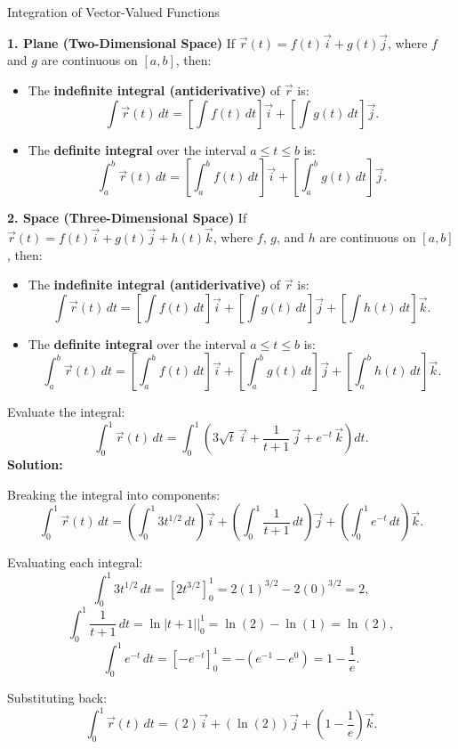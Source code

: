 \documentclass[12pt]{article}
\theoremstyle{beautifulthm}
\begin{document}
\begin{Definition}{Integration of Vector-Valued Functions}{}
    


\textbf{1. Plane (Two-Dimensional Space)}
If $\vec{r}(t) = f(t) \vec{i} + g(t) \vec{j}$, where $f$ and $g$ are continuous on $[a, b]$, then:
\begin{itemize}
    \item The \textbf{indefinite integral (antiderivative)} of $\vec{r}$ is:
    \[
    \int \vec{r}(t) \, dt = \left[ \int f(t) \, dt \right] \vec{i} + \left[ \int g(t) \, dt \right] \vec{j}.
    \]
    \item The \textbf{definite integral} over the interval $a \leq t \leq b$ is:
    \[
    \int_a^b \vec{r}(t) \, dt = \left[ \int_a^b f(t) \, dt \right] \vec{i} + \left[ \int_a^b g(t) \, dt \right] \vec{j}.
    \]
\end{itemize}

\textbf{2. Space (Three-Dimensional Space)}
If $\vec{r}(t) = f(t) \vec{i} + g(t) \vec{j} + h(t) \vec{k}$, where $f$, $g$, and $h$ are continuous on $[a, b]$, then:
\begin{itemize}
    \item The \textbf{indefinite integral (antiderivative)} of $\vec{r}$ is:
    \[
    \int \vec{r}(t) \, dt = \left[ \int f(t) \, dt \right] \vec{i} + \left[ \int g(t) \, dt \right] \vec{j} + \left[ \int h(t) \, dt \right] \vec{k}.
    \]
    \item The \textbf{definite integral} over the interval $a \leq t \leq b$ is:
    \[
    \int_a^b \vec{r}(t) \, dt = \left[ \int_a^b f(t) \, dt \right] \vec{i} + \left[ \int_a^b g(t) \, dt \right] \vec{j} + \left[ \int_a^b h(t) \, dt \right] \vec{k}.
    \]
\end{itemize}

\end{Definition}

\begin{tcolorbox}[colback=examplebg, colframe=red!75!black, title=\textbf{EXAMPLE 1: Definite Integral of a Vector-Valued Function}, fonttitle=\bfseries, sharp corners]


Evaluate the integral:
\[
\int_{0}^{1} \vec{r}(t) \, dt = \int_{0}^{1} \left( 3\sqrt{t} \, \vec{i} + \frac{1}{t+1} \, \vec{j} + e^{-t} \, \vec{k} \right) dt.
\]
\tcblower
\textbf{Solution:} 

Breaking the integral into components:
\[
\int_{0}^{1} \vec{r}(t) \, dt = \left( \int_{0}^{1} 3t^{1/2} \, dt \right) \vec{i} + \left( \int_{0}^{1} \frac{1}{t+1} \, dt \right) \vec{j} + \left( \int_{0}^{1} e^{-t} \, dt \right) \vec{k}.
\]

Evaluating each integral:
\[
\int_{0}^{1} 3t^{1/2} \, dt = \left[ 2t^{3/2} \right]_{0}^{1} = 2(1)^{3/2} - 2(0)^{3/2} = 2,
\]
\[
\int_{0}^{1} \frac{1}{t+1} \, dt = \ln|t+1| \Big|_{0}^{1} = \ln(2) - \ln(1) = \ln(2),
\]
\[
\int_{0}^{1} e^{-t} \, dt = \left[ -e^{-t} \right]_{0}^{1} = -(e^{-1} - e^{0}) = 1 - \frac{1}{e}.
\]

Substituting back:
\[
\int_{0}^{1} \vec{r}(t) \, dt = \left( 2 \right) \vec{i} + \left( \ln(2) \right) \vec{j} + \left( 1 - \frac{1}{e} \right) \vec{k}.
\]
\end{tcolorbox}
\end{document}

